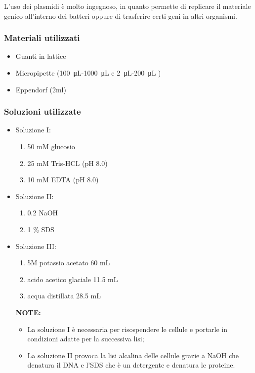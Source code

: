 L'uso dei plasmidi è molto ingegnoso, in quanto permette di replicare il materiale genico all'interno dei batteri
oppure di trasferire certi geni in altri organismi.


\subsubsection{Materiali utilizzati}

\begin{itemize}
	\item Guanti in lattice
	\item Micropipette (\SI{100}{\micro\liter}-\SI{1000}{\micro\liter} e \SI{2}{\micro\liter}-\SI{200}{\micro\liter}  )
	\item Eppendorf (2ml)
\end{itemize}


\subsubsection{Soluzioni utilizzate}

\begin{itemize}

	\item Soluzione I:
  \begin{enumerate}
    \item 50 mM glucosio
    \item 25 mM Tris-HCL (pH 8.0)
    \item 10 mM EDTA (pH 8.0)
  \end{enumerate}
	\item Soluzione II:
  \begin{enumerate}
    \item 0.2 NaOH
    \item 1 \% SDS
  \end{enumerate}
	\item Soluzione III:
  \begin{enumerate}
    \item 5M potassio acetato 60 mL
    \item acido acetico glaciale 11.5 mL
    \item acqua distillata 28.5 mL
  \end{enumerate}

\vspace{0.5cm}

\textbf{NOTE:}
\begin{itemize}
  \item La soluzione I è necessaria per risospendere le cellule e portarle in condizioni
	adatte per la successiva lisi;
  \item La soluzione II provoca la lisi alcalina delle cellule grazie a NaOH che denatura
	il DNA e l’SDS che è un detergente e denatura le proteine.
\end{itemize}



\end{itemize}

